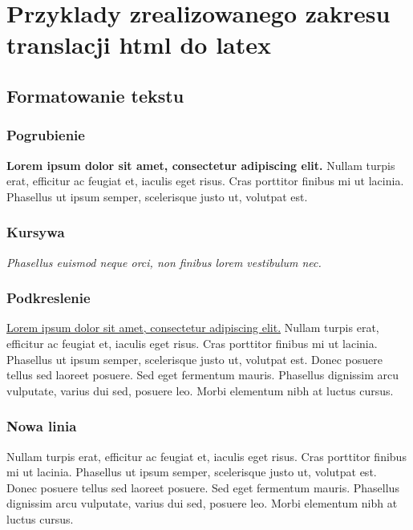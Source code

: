 \documentclass{report}
\begin{document}
    \chapter{Przyklady zrealizowanego zakresu translacji html do latex}

    \section{Formatowanie tekstu}
        \subsection{Pogrubienie}
            \textbf{Lorem ipsum dolor sit amet, consectetur adipiscing elit.} 
            Nullam turpis erat, efficitur ac feugiat et, iaculis eget 
            risus. Cras porttitor finibus mi ut lacinia. Phasellus ut 
            ipsum semper, scelerisque justo ut, volutpat est. 

        \subsection{Kursywa}
            \textit{Phasellus euismod neque orci, non finibus lorem vestibulum nec.}

        \subsection{Podkreslenie}
            \underline{Lorem ipsum dolor sit amet, consectetur adipiscing elit.} 
            Nullam turpis erat, efficitur ac feugiat et, iaculis eget 
            risus. Cras porttitor finibus mi ut lacinia. Phasellus ut 
            ipsum semper, scelerisque justo ut, volutpat est. Donec posuere 
            tellus sed laoreet posuere. Sed eget fermentum mauris. Phasellus 
            dignissim arcu vulputate, varius dui sed, posuere leo. Morbi 
            elementum nibh at luctus cursus.
        
        \subsection{Nowa linia}
            Nullam turpis erat, efficitur ac feugiat et, iaculis eget 
            risus. Cras porttitor finibus mi ut lacinia. Phasellus ut 
            ipsum semper, scelerisque justo ut, volutpat est. \newline Donec posuere 
            tellus sed laoreet posuere. Sed eget fermentum mauris. Phasellus 
            dignissim arcu vulputate, varius dui sed, posuere leo. Morbi 
            elementum nibh at luctus cursus. 
\end{document}
